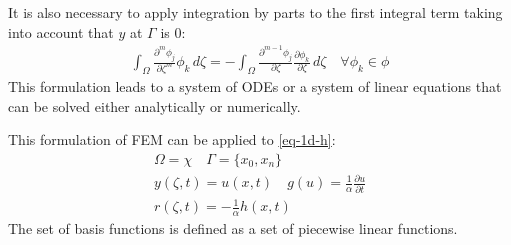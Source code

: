 It is also necessary to apply integration by parts to the first integral term taking into account that \(y\) at \(\Gamma\) is 0:
\begin{gather}
\int_{\Omega} \frac{\partial^{m} \phi_{j}}{\partial \zeta^{m}} \phi_{k} \, d\zeta = - \int_{\Omega} \frac{\partial^{m-1} \phi_{j}}{\partial \zeta} \frac{\partial \phi_{k}}{\partial \zeta} \, d\zeta \quad \forall \phi_{k} \in \phi \label{eq-req-orth}
\end{gather}
This formulation leads to a system of ODEs or a system of linear equations that can be solved either analytically or numerically. 

This formulation of FEM can be applied to \ref{eq-1d-h}:
\begin{gather}
\Omega = \chi \quad \Gamma = \{x_{0}, x_{n}\} \\
y(\zeta, t) = u(x, t) \quad g(u) = \frac{1}{\alpha} \frac{\partial u}{\partial t} \\
r(\zeta, t) = - \frac{1}{\alpha} h(x,t)
\end{gather}
The set of basis functions is defined as a set of piecewise linear functions.

